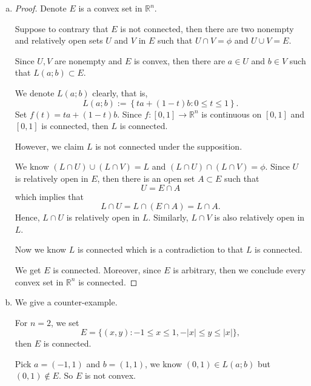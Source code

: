 \begin{Exercise}
\begin{enumerate}[a)]
\item
\begin{proof}
Denote $E$ is a convex set in $\mathbb{R}^n$. 

Suppose to contrary that $E$ is not connected, then there are two nonempty and relatively open sets $U$ and $V$ in $E$ such that $U\cap V = \phi$ and $U\cup V = E$.

Since $U,V$ are nonempty and $E$ is convex, then there are $a\in U$ and $b\in V$ such that $L(a;b)\subset E$.

We denote $L(a;b)$ clearly, that is,
$$
L(a;b) := \left\{t a + (1-t) b: 0\leq t \leq 1 \right\}.
$$
Set $f(t)=ta+(1-t)b$. Since $f:[0,1]\to \mathbb{R}^n$ is continuous on $[0,1]$ and $[0,1]$ is connected, then $L$ is connected.

However, we claim $L$ is not connected under the supposition.

We know $(L\cap U)\cup(L\cap V) = L$ and $(L\cap U)\cap(L\cap V) = \phi$. Since $U$ is relatively open in $E$, then there is an open set $A\subset E$ such that
$$
U = E\cap A
$$
which implies that
$$
L\cap U = L\cap(E\cap A) = L\cap A.
$$
Hence, $L\cap U$ is relatively open in $L$. Similarly, $L\cap V$ is also relatively open in $L$.

Now we know $L$ is connected which is a contradiction to that $L$ is connected.

We get $E$ is connected. Moreover, since $E$ is arbitrary, then we conclude every convex set in $\mathbb{R}^n$ is connected.
\end{proof}

\item
\begin{solution}
We give a counter-example.

For $n=2$, we set $$E = \{(x,y):-1\leq x \leq 1, -|x| \leq y \leq |x|\},$$ then $E$ is connected.

Pick $a=(-1,1)$ and $b=(1,1)$, we know $(0,1)\in L(a;b)$ but $(0,1)\notin E$. So $E$ is not convex.
\end{solution}
\end{enumerate}
\end{Exercise}
